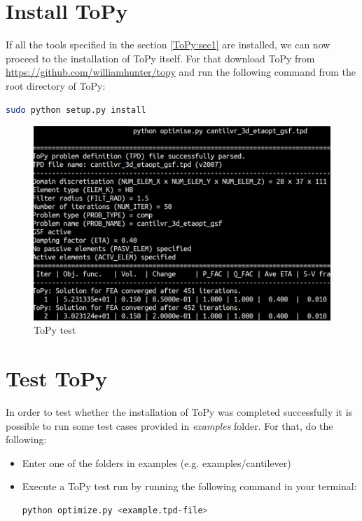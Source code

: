 \documentclass[11pt,a4paper,article,bibtotoc,idxtotoc,headsepline,footsepline,footexclude,DIV13,oneside]{scrbook}
\begin{document}
	\section{Install ToPy}
	If all the tools specified in the section \ref{ToPy:sec1} are installed, we can now proceed to the installation of ToPy itself. For that download ToPy from \href{https://github.com/williamhunter/topy}{https://github.com/williamhunter/topy} and run the following command from the root directory of ToPy:
\begin{lstlisting}[language=bash]
sudo python setup.py install
\end{lstlisting}	
	\begin{figure}
	\centering
	\includegraphics[scale=0.3]{img/ToPy_ExampleRun_cut.png}
	\caption{ToPy test}
	\label{fig:ToPy_test}
	\end{figure}


	\section{Test ToPy}
	In order to test whether the installation of ToPy was completed successfully it is possible to run some test cases provided in \textit{examples} folder. For that, do the following:
	\begin{itemize}
	\item Enter one of the folders in examples (e.g. examples/cantilever)
	\item Execute a ToPy test run by running the following command in your terminal:
\begin{lstlisting}[language=bash]
python optimize.py <example.tpd-file>
\end{lstlisting}	
	\end{itemize}
	
\end{document}
